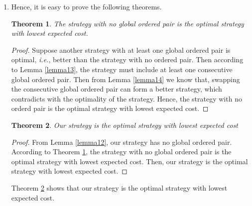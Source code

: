 \documentclass{oxmathproblems}
\makeatletter
\newtheorem{theorem}{Theorem}
\theoremstyle{definition}
\renewenvironment{solution}[1][Solution] {\par\pushQED{\qed}\normalfont\topsep6\p@\@plus6\p@\relax\trivlist\item[\hskip\labelsep\bfseries#1\@addpunct{.}]\ignorespaces}{\popQED\endtrivlist\@endpefalse} \makeatother
\makeatother
\begin{document}
\begin{enumerate}
\begin{solution}
	Hence, it is easy to prove the following theorems.
	\begin{theorem}\label{th15}
		The strategy with no global ordered pair is the optimal strategy with lowest expected cost.
	\end{theorem}
	\begin{proof}
		Suppose another strategy with at least one global ordered pair is optimal, \textit{i.e.}, better than the strategy with no ordered pair. Then according to Lemma \ref{lemma13}, the strategy must include at least one consecutive global ordered pair. Then from Lemma \ref{lemma14} we know that, swapping the consecutive global ordered pair can form a better strategy, which contradicts with the optimality of the strategy. Hence, the strategy with no orderd pair is the optimal strategy with lowest expected cost.
	\end{proof}
	\begin{theorem}\label{th16}
	Our strategy is the optimal strategy with lowest expected cost
	\end{theorem}
	\begin{proof}
		From Lemma \ref{lemma12}, our strategy has no global ordered pair. According to Theorem \ref{th15}, the strategy with no global ordered pair is the optimal strategy with lowest expected cost. Then, our strategy is the optimal strategy with lowest expected cost.
	\end{proof}
	Theorem \ref{th16} shows that our strategy is the optimal strategy with lowest expected cost.
\end{solution}
\end{enumerate}
\end{document}
